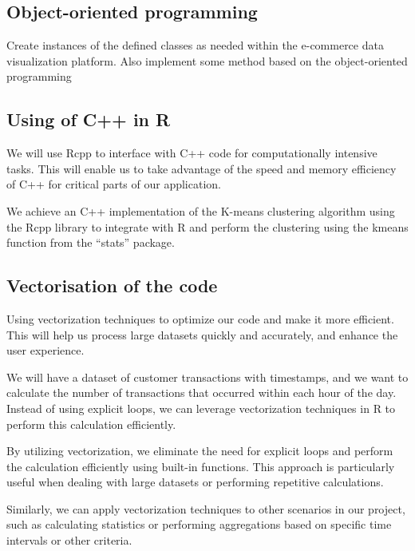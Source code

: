 \documentclass[
  11pt,
]{article}
\begin{document}
\hypertarget{object-oriented-programming}{%
\subsection{Object-oriented
programming}\label{object-oriented-programming}}

Create instances of the defined classes as needed within the e-commerce
data visualization platform. Also implement some method based on the
object-oriented programming

\hypertarget{using-of-c-in-r}{%
\subsection{Using of C++ in R}\label{using-of-c-in-r}}

We will use Rcpp to interface with C++ code for computationally
intensive tasks. This will enable us to take advantage of the speed and
memory efficiency of C++ for critical parts of our application.

We achieve an C++ implementation of the K-means clustering algorithm
using the Rcpp library to integrate with R and perform the clustering
using the kmeans function from the ``stats'' package.

\hypertarget{vectorisation-of-the-code}{%
\subsection{Vectorisation of the code}\label{vectorisation-of-the-code}}

Using vectorization techniques to optimize our code and make it more
efficient. This will help us process large datasets quickly and
accurately, and enhance the user experience.

We will have a dataset of customer transactions with timestamps, and we
want to calculate the number of transactions that occurred within each
hour of the day. Instead of using explicit loops, we can leverage
vectorization techniques in R to perform this calculation efficiently.

By utilizing vectorization, we eliminate the need for explicit loops and
perform the calculation efficiently using built-in functions. This
approach is particularly useful when dealing with large datasets or
performing repetitive calculations.

Similarly, we can apply vectorization techniques to other scenarios in
our project, such as calculating statistics or performing aggregations
based on specific time intervals or other criteria.
\end{document}
